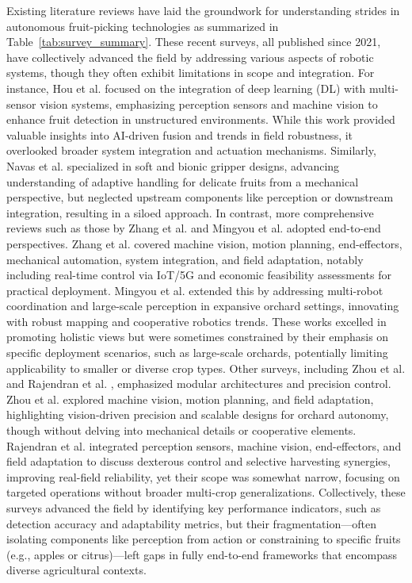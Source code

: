 \documentclass[a4paper,fleqn]{cas-dc}
\begin{document}
Existing literature reviews have laid the groundwork for understanding strides in autonomous fruit-picking technologies as summarized in Table~\ref{tab:survey_summary}. These recent surveys, all published since 2021, have collectively advanced the field by addressing various aspects of robotic systems, though they often exhibit limitations in scope and integration.
For instance, Hou et al. \cite{hou2023overview} focused on the integration of deep learning (DL) with multi-sensor vision systems, emphasizing perception sensors and machine vision to enhance fruit detection in unstructured environments. While this work provided valuable insights into AI-driven fusion and trends in field robustness, it overlooked broader system integration and actuation mechanisms. Similarly, Navas et al. \cite{navas2021soft} specialized in soft and bionic gripper designs, advancing understanding of adaptive handling for delicate fruits from a mechanical perspective, but neglected upstream components like perception or downstream integration, resulting in a siloed approach.
In contrast, more comprehensive reviews such as those by Zhang et al. \cite{zhang2024automatic} and Mingyou et al. \cite{mingyou2024orchard} adopted end-to-end perspectives. Zhang et al. covered machine vision, motion planning, end-effectors, mechanical automation, system integration, and field adaptation, notably including real-time control via IoT/5G and economic feasibility assessments for practical deployment. Mingyou et al. extended this by addressing multi-robot coordination and large-scale perception in expansive orchard settings, innovating with robust mapping and cooperative robotics trends. These works excelled in promoting holistic views but were sometimes constrained by their emphasis on specific deployment scenarios, such as large-scale orchards, potentially limiting applicability to smaller or diverse crop types.
Other surveys, including Zhou et al. \cite{zhou2022intelligent} and Rajendran et al. \cite{rajendran2024towards}, emphasized modular architectures and precision control. Zhou et al. explored machine vision, motion planning, and field adaptation, highlighting vision-driven precision and scalable designs for orchard autonomy, though without delving into mechanical details or cooperative elements. Rajendran et al. integrated perception sensors, machine vision, end-effectors, and field adaptation to discuss dexterous control and selective harvesting synergies, improving real-field reliability, yet their scope was somewhat narrow, focusing on targeted operations without broader multi-crop generalizations. Collectively, these surveys advanced the field by identifying key performance indicators, such as detection accuracy and adaptability metrics, but their fragmentation—often isolating components like perception from action or constraining to specific fruits (e.g., apples or citrus)—left gaps in fully end-to-end frameworks that encompass diverse agricultural contexts.
\end{document}
